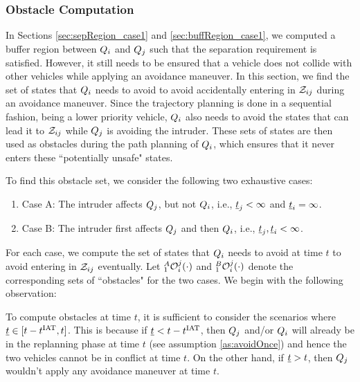 \subsubsection{Obstacle Computation} \label{sec:intruderObs_case1}
In Sections \ref{sec:sepRegion_case1} and \ref{sec:buffRegion_case1}, we computed a buffer region between $Q_i$ and $Q_j$ such that the separation requirement is satisfied.
However, it still needs to be ensured that a vehicle does not collide with other vehicles while applying an avoidance maneuver. 
In this section, we find the set of states that $Q_i$ needs to avoid to avoid accidentally entering in $\mathcal{Z}_{ij}$ during an avoidance maneuver. Since the trajectory planning is done in a sequential fashion, being a lower priority vehicle, $Q_i$ also needs to avoid the states that can lead it to $\mathcal{Z}_{ij}$ while $Q_j$ is avoiding the intruder.
These sets of states are then used as obstacles during the path planning of $Q_i$, which ensures that it never enters these ``potentially unsafe" states.

To find this obstacle set, we consider the following two exhaustive cases:
\begin{enumerate}
\item Case A: The intruder affects $Q_j$, but not $Q_i$, i.e., $\underline{t}_j < \infty$ and $\underline{t}_i = \infty$.
\item Case B: The intruder first affects $Q_j$ and then $Q_i$, i.e., $\underline{t}_j, \underline{t}_i < \infty$.
\end{enumerate}
For each case, we compute the set of states that $Q_i$ needs to avoid at time $t$ to avoid entering in $\mathcal{Z}_{ij}$ eventually. Let $_1^A\mathcal{O}_i^j(\cdot)$ and $_1^B\mathcal{O}_i^j(\cdot)$ denote the corresponding sets of ``obstacles" for the two cases. We begin with the following observation: 
\begin{observation} \label{obs1_case1Obs}
To compute obstacles at time $t$, it is sufficient to consider the scenarios where $\underline{t} \in [t-t^\text{IAT}, t]$. This is because if $\underline{t} < t - t^\text{IAT}$, then $Q_j$ and/or $Q_i$ will already be in the replanning phase at time $t$ (see assumption \ref{as:avoidOnce}) and hence the two vehicles cannot be in conflict at time $t$. On the other hand, if $\underline{t} > t$, then $Q_j$ wouldn't apply any avoidance maneuver at time $t$. 
\end{observation}

